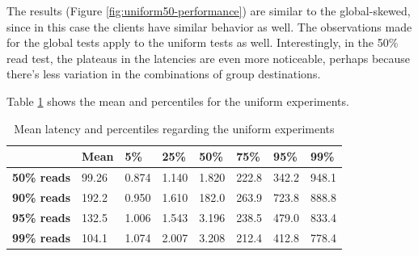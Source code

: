 The results (Figure \ref{fig:uniform50-performance}) are similar to the global-skewed, since in this case the clients have similar behavior as well. The observations made for the global tests apply to the uniform tests as well. Interestingly, in the 50\% read test, the plateaus in the latencies are even more noticeable, perhaps because there's less variation in the combinations of group destinations.

Table \ref{tab:uniform-latencies-table} shows the mean and percentiles for the uniform experiments.

\begin{table}[!htb]
  \centering
  \begin{tabular}{l l l l l l l l}
    \hline
    & \textbf{Mean} & \textbf{5\%} & \textbf{25\%} & \textbf{50\%} & \textbf{75\%} & \textbf{95\%}& \textbf{99\%} \\
    \hline
    \textbf{50\% reads} & 99.26 & 0.874 & 1.140 & 1.820 & 222.8 & 342.2 & 948.1 \\
    \textbf{90\% reads} & 192.2 & 0.950 & 1.610 & 182.0 & 263.9 & 723.8 & 888.8 \\
    \textbf{95\% reads} & 132.5 & 1.006 & 1.543 & 3.196 & 238.5 & 479.0 & 833.4 \\
    \textbf{99\% reads} & 104.1 & 1.074 & 2.007 & 3.208 & 212.4 & 412.8 & 778.4 \\
    \hline
  \end{tabular}
  \caption{Mean latency and percentiles regarding the uniform experiments}\label{tab:uniform-latencies-table}
\end{table}


